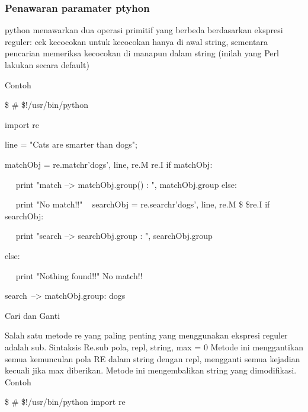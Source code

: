 \subsubsection {Penawaran paramater ptyhon}
python menawarkan dua operasi primitif yang berbeda berdasarkan ekspresi reguler: cek kecocokan untuk kecocokan hanya di awal string, sementara pencarian memeriksa kecocokan di manapun dalam string (inilah yang Perl lakukan secara default)

Contoh \par
\noindent 
 \$  \#  \$!/usr/bin/python \par
\noindent 
import re \par
\vspace{12pt}
\noindent 
line = "Cats are smarter than dogs"; 
\begin{12pt}
\noindent 
matchObj = re.match{r'dogs', line, re.M  \vert  re.I} 
\noindent 
if matchObj: \par
\noindent 
~~ print "match --> matchObj.group() : ", matchObj.group{} 
\noindent 
else: \par
\noindent 
~~ print "No match!!" \
\vspace{12pt}
\noindent 
searchObj = re.search{r'dogs', line, re.M \$  \vert  \$re.I} 
\noindent 
if searchObj: \par
\item
~~ print "search --> searchObj.group{} : ", searchObj.group{} 
\item
else: \par
\noindent 
~~ print "Nothing found!!" 
\vspace{12pt}
\noindent 
No match!! \par
\noindent 
search~--> matchObj.group{}:  dogs 
\begin{12pt}
\item
Cari dan Ganti \par
\begin{12pt}
\noindent 
Salah satu metode re yang paling penting yang menggunakan ekspresi reguler adalah sub. 
\noindent 
Sintaksis 
\vspace{12pt}
Re.sub {pola, repl, string, max = 0} 
\vspace{12pt}
\noindent 
Metode ini menggantikan semua kemunculan pola RE dalam string dengan repl, mengganti semua kejadian kecuali jika max diberikan. Metode ini mengembalikan string yang dimodifikasi. 
Contoh \par
\noindent 
 \$  \#  \$!/usr/bin/python 
\noindent 
import re \par
\vspace{12pt}

\end{12pt}
\end{12pt}
\end{12pt}
